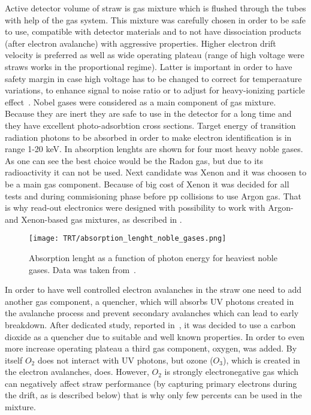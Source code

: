 Active detector volume of straw is gas mixture which is flushed through the tubes with help of the gas system.
This mixture was carefully chosen in order to be safe to use, compatible with detector materials and to not have dissociation products (after electron avalanche) 
with aggressive properties.
Higher electron drift velocity is preferred as well as wide operating plateau (range of high voltage were straws works in the proportional regime). 
Latter is important in order to have 
safety margin in case high voltage has to be changed to correct for temperaature variations, to enhance signal to noise ratio or to adjust for 
heavy-ionizing particle effect~\cite{Abat:2008zza}.
Nobel gases were considered as a main component of gas mixture. Because they are inert they are safe to use in the detector for a long time and they have 
excellent photo-adsorbtion cross sections.
Target energy of transition radiation photons to be absorbed in order to make electron identification is in range 1-20 keV.
In  absorption lenghts are shown for four most heavy noble gases.
As one can see the best choice would be the Radon gas, but due to its radioactivity it can not be used.
Next candidate was Xenon and it was choosen to be a main gas component.
Because of big cost of Xenon it was decided for all tests and during commisioning phase before pp collisions to use Argon gas. That is why read-out electronics were
designed with possibility to work with Argon- and Xenon-based gas mixtures, as described in .

\begin{figure}
\centering
\texttt{[image: TRT/absorption\_lenght\_noble\_gases.png]}
\caption{ 
  Absorption lenght as a function of photon energy for heaviest noble gases. Data was taken from~\cite{Hubbell:353989}.
}
\label{fig:absorption_lenght}
\end{figure}

In order to have well controlled electron avalanches in the straw one need to add another gas component, a quencher, 
which will absorbs UV photons created in the avalanche process and prevent secondary avalanches which can lead to early breakdown.
After dedicated study, reported in~\cite{Abat:2008zza}, it was decided to use a carbon dioxide as a quencher due to suitable and well known properties.
In order to even more increase operating plateau a third gas component, oxygen, was added.
By itself $O_2$ does not interact with UV photons, but ozone ($O_3$), which is created in the electron avalanches, does.
However, $O_2$ is strongly electronegative gas which can negatively affect straw performance (by capturing primary electrons during the drift, as is described below)
that is why only few percents can be used in the mixture.
 
